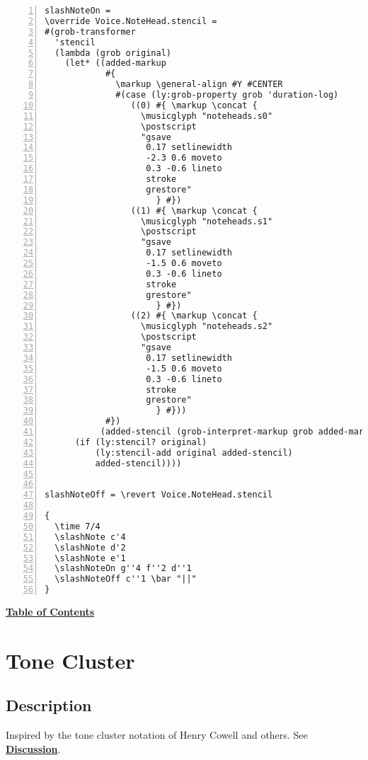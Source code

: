 \begin{Verbatim}[numbers=left,xleftmargin=5mm]
slashNoteOn =
\override Voice.NoteHead.stencil =
#(grob-transformer
  'stencil
  (lambda (grob original)
    (let* ((added-markup
            #{
              \markup \general-align #Y #CENTER
              #(case (ly:grob-property grob 'duration-log)
                 ((0) #{ \markup \concat {
                   \musicglyph "noteheads.s0"
                   \postscript
                   "gsave 
                    0.17 setlinewidth 
                    -2.3 0.6 moveto 
                    0.3 -0.6 lineto
                    stroke 
                    grestore"
                      } #})
                 ((1) #{ \markup \concat {
                   \musicglyph "noteheads.s1"
                   \postscript
                   "gsave 
                    0.17 setlinewidth 
                    -1.5 0.6 moveto 
                    0.3 -0.6 lineto
                    stroke 
                    grestore"
                      } #})
                 ((2) #{ \markup \concat {
                   \musicglyph "noteheads.s2"
                   \postscript
                   "gsave 
                    0.17 setlinewidth 
                    -1.5 0.6 moveto 
                    0.3 -0.6 lineto
                    stroke 
                    grestore"
                      } #}))
            #})
           (added-stencil (grob-interpret-markup grob added-markup)))
      (if (ly:stencil? original)
          (ly:stencil-add original added-stencil)
          added-stencil))))


slashNoteOff = \revert Voice.NoteHead.stencil

{
  \time 7/4
  \slashNote c'4
  \slashNote d'2
  \slashNote e'1
  \slashNoteOn g''4 f''2 d''1
  \slashNoteOff c''1 \bar "||"
}
\end{Verbatim}
\hyperref[sec:toc]{\textbf{Table of Contents}}

\vfill \break



\section {Tone Cluster}
\hfill
\subsection{Description}
Inspired by the tone cluster notation of Henry Cowell and others. See \hyperref[sec:tone_cluster_discussion]{\textbf{Discussion}}.
